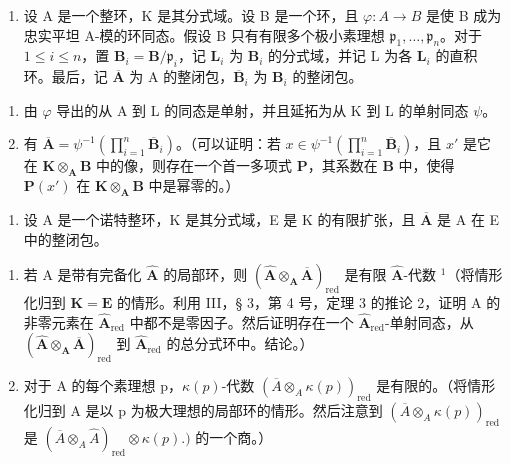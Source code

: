 \begin{enumerate}
\def\labelenumi{\arabic{enumi})}
\setcounter{enumi}{7}
\tightlist
\item
  设 A 是一个整环，K 是其分式域。设 B 是一个环，且 \(\varphi: A \to B\) 是使 B 成为忠实平坦 A-模的环同态。假设 B 只有有限多个极小素理想 \(\mathfrak{p}_1, \ldots, \mathfrak{p}_n\)。对于 \(1 \leqslant i \leqslant n\)，置 \(\mathbf{B}_i = \mathbf{B} / \mathfrak{p}_i\)，记 \(\mathbf{L}_i\) 为 \(\mathbf{B}_i\) 的分式域，并记 L 为各 \(\mathbf{L}_i\) 的直积环。最后，记 \(\overline{\mathbf{A}}\) 为 A 的整闭包，\(\overline{\mathbf{B}}_i\) 为 \(\mathbf{B}_i\) 的整闭包。
\end{enumerate}

\begin{enumerate}
\def\labelenumi{\alph{enumi})}
\item
  由 \(\varphi\) 导出的从 A 到 L 的同态是单射，并且延拓为从 K 到 L 的单射同态 \(\psi\)。
\item
  有 \(\overline{\mathbf{A}} = \psi^{-1}(\prod_{i=1}^{n} \overline{\mathbf{B}}_i)\)。（可以证明：若 \(x \in \psi^{-1}(\prod_{i=1}^{n} \overline{\mathbf{B}}_i)\)，且 \(x'\) 是它在 \(\mathbf{K} \otimes_{\mathbf{A}} \mathbf{B}\) 中的像，则存在一个首一多项式 \(\mathbf{P}\)，其系数在 \(\mathbf{B}\) 中，使得 \(\mathbf{P}(x')\) 在 \(\mathbf{K} \otimes_{\mathbf{A}} \mathbf{B}\) 中是幂零的。）
\end{enumerate}

\begin{enumerate}
\def\labelenumi{\arabic{enumi})}
\setcounter{enumi}{8}
\tightlist
\item
  设 A 是一个诺特整环，K 是其分式域，E 是 K 的有限扩张，且 \(\overline{\mathbf{A}}\) 是 A 在 E 中的整闭包。
\end{enumerate}

\begin{enumerate}
\def\labelenumi{\alph{enumi})}
\item
  若 A 是带有完备化 \(\hat{\mathbf{A}}\) 的局部环，则 \((\hat{\mathbf{A}} \otimes_{\mathbf{A}} \overline{\mathbf{A}})_{\mathrm{red}}\) 是有限 \(\hat{\mathbf{A}}\)-代数 \(^{1}\)（将情形化归到 \(\mathbf{K} = \mathbf{E}\) 的情形。利用 III，§ 3，第 4 号，定理 3 的推论 2，证明 A 的非零元素在 \(\hat{\mathbf{A}}_{\mathrm{red}}\) 中都不是零因子。然后证明存在一个 \(\hat{\mathbf{A}}_{\mathrm{red}}\)-单射同态，从 \((\hat{\mathbf{A}} \otimes_{\mathbf{A}} \overline{\mathbf{A}})_{\mathrm{red}}\) 到 \(\hat{\mathbf{A}}_{\mathrm{red}}\) 的总分式环中。结论。）
\item
  对于 A 的每个素理想 p，\(\kappa(p)\)-代数 \((\overline{A} \otimes_A \kappa(p))_{\text{red}}\) 是有限的。（将情形化归到 A 是以 p 为极大理想的局部环的情形。然后注意到 \((\overline{A} \otimes_A \kappa(p))_{\text{red}}\) 是 \((\overline{A} \otimes_A \hat{A})_{\text{red}} \otimes \kappa(p).)\) 的一个商。）
\end{enumerate}

